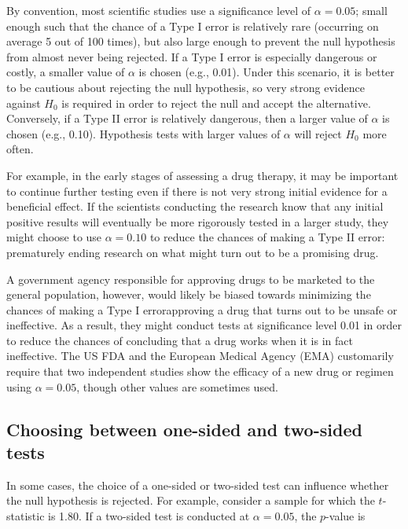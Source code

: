 \label{significanceLevel}

By convention, most scientific studies use a significance level of $\alpha = 0.05$; small enough such that the chance of a Type I error is relatively rare (occurring on average 5 out of 100 times), but also large enough to prevent the null hypothesis from almost never being rejected. If a Type I error is especially dangerous or costly, a smaller value of $\alpha$ is chosen (e.g., 0.01). Under this scenario, it is better to be cautious about rejecting the null hypothesis, so very strong evidence against $H_0$ is required in order to reject the null and accept the alternative. Conversely, if a Type II error is relatively dangerous, then a larger value of $\alpha$ is chosen (e.g., 0.10). Hypothesis tests with larger values of $\alpha$ will reject $H_0$ more often.

For example, in the early stages of assessing a drug therapy, it may be important to continue further testing even if there is not very strong initial evidence for a beneficial effect. If the scientists conducting the research know that any initial positive results will eventually be more rigorously tested in a larger study, they might choose to use $\alpha = 0.10$ to reduce the chances of making a Type II error: prematurely ending research on what might turn out to be a promising drug.

\textD{\newpage}

A government agency responsible for approving drugs to be marketed to the general population, however, would likely be biased towards minimizing the chances of making a Type I error\textemdash approving a drug that turns out to be unsafe or ineffective. As a result, they might conduct tests at significance level 0.01 in order to reduce the chances of concluding that a drug works when it is in fact ineffective. The US FDA and the European Medical Agency (EMA) customarily require that two independent studies show the efficacy of a new drug or regimen using $\alpha = 0.05$, though other values are sometimes used.\textD{\vspace{5mm}}


\subsection{Choosing between one-sided and two-sided tests}

In some cases, the choice of a one-sided or two-sided test can influence whether the null hypothesis is rejected. For example, consider a sample for which the $t$-statistic is 1.80. If a two-sided test is conducted at $\alpha = 0.05$, the $p$-value is

